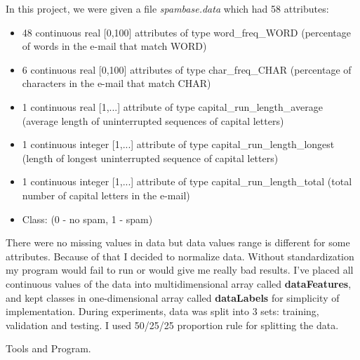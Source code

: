 \documentclass[12pt, letterpaper]{article}
\begin{document}
\begin{enumerate}[label=\Roman*.]
	 In this project, we were given a file {\it spambase.data} which had 58 attributes:
	 \begin{itemize}
	 	\item 48 continuous real [0,100] attributes of type word\_freq\_WORD (percentage of words in the e-mail that match WORD)
		\item 6 continuous real [0,100] attributes of type char\_freq\_CHAR (percentage of characters in the e-mail that match CHAR)
		\item 1 continuous real [1,...] attribute of type capital\_run\_length\_average (average length of uninterrupted sequences of capital letters)
		\item 1 continuous integer [1,...] attribute of type capital\_run\_length\_longest (length of longest uninterrupted sequence of capital letters)
		\item 1 continuous integer [1,...] attribute of type capital\_run\_length\_total (total number of capital letters in the e-mail)
		\item Class: (0 - no spam, 1 -  spam)
	\end{itemize}
	
	There were no missing values in data but data values range is different for some attributes. Because of that I decided to normalize data. Without standardization my program would fail to run or would give me really bad results.
	I've placed all continuous values of the data into multidimensional array called {\bf dataFeatures}, and kept classes in one-dimensional array called {\bf dataLabels} for simplicity of implementation. During experiments, data was split into 3 sets: training, validation and testing. I used 50/25/25 proportion rule for splitting the data. 
		
	{\bf \item Tools and Program.}\\
	

\end{enumerate}
\end{document}
